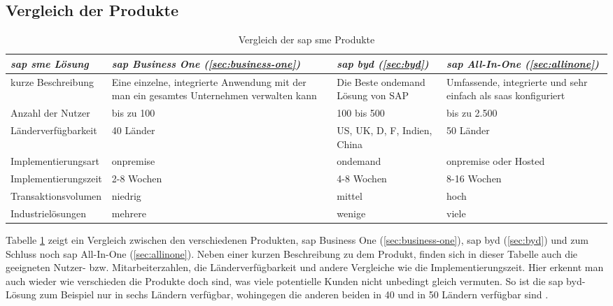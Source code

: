 \subsection{Vergleich der Produkte}
\begin{table}[H]
\begin{center}
\begin{tabular}{p{3.8cm}||p{3cm}|p{3cm}|p{3cm}}
  \emph{\gls{sap} \gls{sme} Lösung} & \emph{\gls{sap} Business One (\ref{sec:business-one})} & \emph{\gls{sap} \gls{byd} (\ref{sec:byd})} & \emph{\gls{sap} All-In-One (\ref{sec:allinone})}\\	
  \hline
  kurze Beschreibung & Eine einzelne, integrierte Anwendung mit der man ein gesamtes Unternehmen verwalten kann & Die Beste \gls{ondemand} Lösung von SAP & Umfassende, integrierte und sehr einfach als \gls{saas} konfiguriert\\
  \hline
  Anzahl der Nutzer & bis zu 100 & 100 bis 500 &  bis zu 2.500\\
  \hline
  Länderverfügbarkeit & 40 Länder & US, UK, D, F, Indien, China & 50 Länder\\
  \hline	
  Implementierungsart & \gls{onpremise} & \gls{ondemand} & \gls{onpremise} oder Hosted\\
  \hline	
  Implementierungszeit & 2-8 Wochen & 4-8 Wochen & 8-16 Wochen\\
  \hline	
  Transaktionsvolumen & niedrig & mittel & hoch\\
  \hline	
  Industrielösungen & mehrere & wenige & viele\\
  \hline				
\end{tabular}
\end{center}
\caption{Vergleich der \gls{sap} \gls{sme} Produkte} 
\label{tab:smevergleich}
\end{table}

Tabelle \ref{tab:smevergleich} zeigt ein Vergleich zwischen den verschiedenen Produkten, \gls{sap} Business One (\ref{sec:business-one}), \gls{sap} \gls{byd} (\ref{sec:byd}) und zum Schluss noch \gls{sap} All-In-One (\ref{sec:allinone}). Neben einer kurzen Beschreibung zu dem Produkt, finden sich in dieser Tabelle auch die geeigneten Nutzer- bzw. Mitarbeiterzahlen, die Länderverfügbarkeit und andere Vergleiche wie die Implementierungszeit. Hier erkennt man auch wieder wie verschieden die Produkte doch sind, was viele potentielle Kunden nicht unbedingt gleich vermuten. So ist die \gls{sap} \gls{byd}-Lösung zum Beispiel nur in sechs Ländern verfügbar, wohingegen die anderen beiden in 40 und in 50 Ländern verfügbar sind \cite{SAPin24hrs}.
